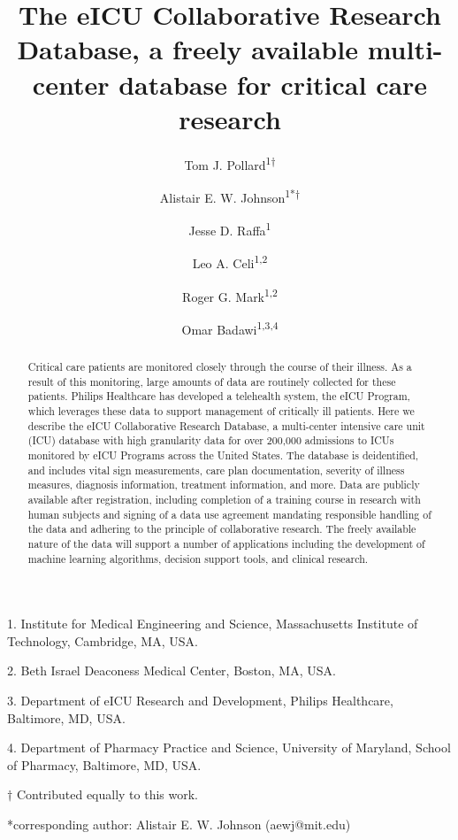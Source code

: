 \documentclass[english]{article}
\begin{document}
\title{The eICU Collaborative Research Database, a freely available multi-center database for critical care research}

\author{Tom J. Pollard\textsuperscript{1{$\dagger$}}
\and Alistair E. W. Johnson\textsuperscript{1{*}{$\dagger$}}
\and Jesse D. Raffa\textsuperscript{1}
\and Leo A. Celi\textsuperscript{1,2}
\and Roger G. Mark\textsuperscript{1,2}
\and Omar Badawi\textsuperscript{1,3,4}}

\maketitle
\thispagestyle{fancy}

1. Institute for Medical Engineering and Science, Massachusetts Institute of Technology, Cambridge, MA, USA.

2. Beth Israel Deaconess Medical Center, Boston, MA, USA.

3. Department of eICU Research and Development, Philips Healthcare, Baltimore, MD, USA.

4. Department of Pharmacy Practice and Science, University of Maryland, School of Pharmacy, Baltimore, MD, USA.

{$\dagger$} Contributed equally to this work.


{*}corresponding author:
Alistair E. W. Johnson (aewj@mit.edu)
\begin{abstract}
Critical care patients are monitored closely through the course of their illness. As a result of this monitoring, large amounts of data are routinely collected for these patients.
Philips Healthcare has developed a telehealth system, the eICU Program, which leverages these data to support management of critically ill patients.
Here we describe the eICU Collaborative Research Database, a multi-center intensive care unit (ICU) database with high granularity data for over 200,000 admissions to ICUs monitored by eICU Programs across the United States.
The database is deidentified, and includes vital sign measurements, care plan documentation, severity of illness measures, diagnosis information, treatment information, and more.
Data are publicly available after registration, including completion of a training course in research with human subjects and signing of a data use agreement mandating responsible handling of the data and adhering to the principle of collaborative research.
The freely available nature of the data will support a number of applications including the development of machine learning algorithms, decision support tools, and clinical research.
\end{abstract}
\end{document}
